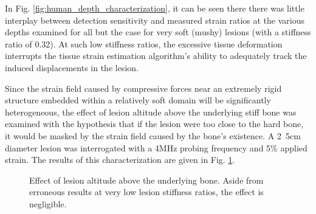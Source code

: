 			In Fig. \ref{fig:human_depth_characterization}, it can be seen there there was little interplay between detection sensitivity and measured strain ratios at the various depths examined for all but the case for very soft (mushy) lesions (with a stiffness ratio of 0.32). At such low stiffness ratios, the excessive tissue deformation interrupts the tissue strain estimation algorithm's ability to adequately track the induced displacements in the lesion.

			Since the strain field caused by compressive forces near an extremely rigid structure embedded within a relatively soft domain will be significantly heterogeneous, the effect of lesion altitude above the underlying stiff bone was examined with the hypothesis that if the lesion were too close to the hard bone, it would be masked by the strain field caused by the bone's existence. A \unit{2.5}{cm} diameter lesion was interrogated with a \unit{4}{MHz} probing frequency and \unit{5}{\%} applied strain. The results of this characterization are given in Fig. \ref{fig:bottomsep_characterization}.

			\begin{figure}[!t]
				\centering
				\caption[Lesion altitude characterization]{Effect of lesion altitude above the underlying bone. Aside from erroneous results at very low lesion stiffness ratios, the effect is negligible.}
				\label{fig:bottomsep_characterization}
			\end{figure}


